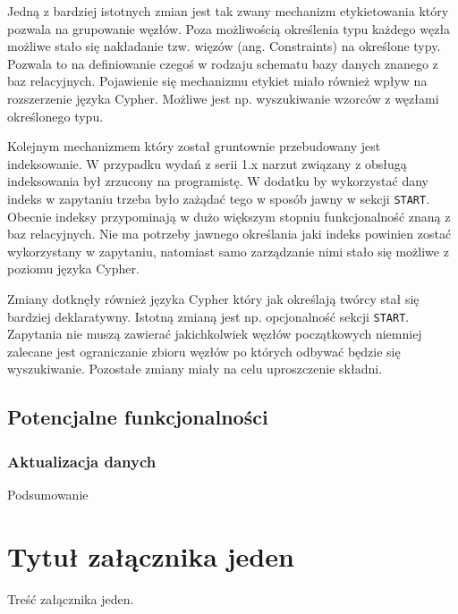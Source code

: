 \documentclass[brudnopis]{xmgr}
\begin{document}
Jedną z bardziej istotnych zmian jest tak zwany mechanizm etykietowania który pozwala na grupowanie węzłów. Poza możliwością określenia typu każdego węzła możliwe stało się nakładanie tzw. więzów (ang. Constraints) na określone typy. Pozwala to na definiowanie czegoś w rodzaju schematu bazy danych znanego z baz relacyjnych. Pojawienie się mechanizmu etykiet miało również wpływ na rozszerzenie języka Cypher. Możliwe jest np. wyszukiwanie wzorców z węzłami określonego typu.

Kolejnym mechanizmem który został gruntownie przebudowany jest indeksowanie. W przypadku wydań z serii 1.x narzut związany z obsługą indeksowania był zrzucony na programistę. W dodatku by wykorzystać dany indeks w zapytaniu trzeba było zażądać tego w sposób jawny w sekcji \texttt{START}. Obecnie indeksy przypominają w dużo większym stopniu funkcjonalność znaną z baz relacyjnych. Nie ma potrzeby jawnego określania jaki indeks powinien zostać wykorzystany w zapytaniu, natomiast samo zarządzanie nimi stało się możliwe z poziomu języka Cypher.

Zmiany dotknęły również języka Cypher który jak określają twórcy stał się bardziej deklaratywny. Istotną zmianą jest np. opcjonalność sekcji \texttt{START}. Zapytania nie muszą zawierać jakichkolwiek węzłów początkowych niemniej zalecane jest ograniczanie zbioru węzłów po których odbywać będzie się wyszukiwanie. Pozostałe zmiany miały na celu uproszczenie składni.

\section{Potencjalne funkcjonalności}

\subsection{Aktualizacja danych}

\summary
Podsumowanie

\appendix
\chapter{Tytuł załącznika jeden}

Treść załącznika jeden.




\listoftables

\listoffigures

\oswiadczenie
\end{document}

